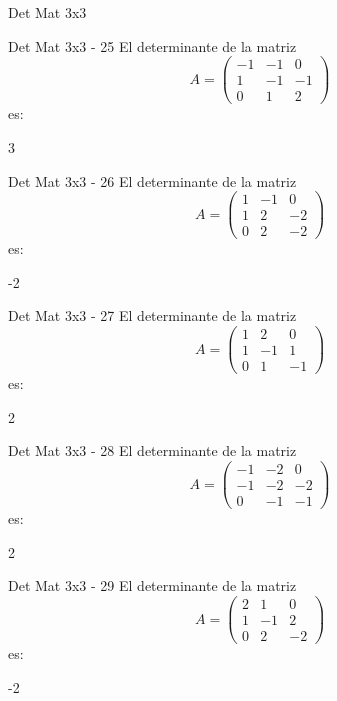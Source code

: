 \documentclass[a4,11pt]{aleph-notas}
\begin{document}
\begin{quiz}{Det Mat 3x3}
\begin{numerical}[tolerance=0]%
    {Det Mat 3x3 - 25}
    El determinante de la matriz
    \[
        A = \begin{pmatrix} -1 & -1 & 0 \\ 1 & -1 & -1 \\ 0 & 1 & 2 \end{pmatrix}
    \]
    es:
    \item[] 3
\end{numerical}

\begin{numerical}[tolerance=0]%
    {Det Mat 3x3 - 26}
    El determinante de la matriz
    \[
        A = \begin{pmatrix} 1 & -1 & 0 \\ 1 & 2 & -2 \\ 0 & 2 & -2 \end{pmatrix}
    \]
    es:
    \item[] -2
\end{numerical}

\begin{numerical}[tolerance=0]%
    {Det Mat 3x3 - 27}
    El determinante de la matriz
    \[
        A = \begin{pmatrix} 1 & 2 & 0 \\ 1 & -1 & 1 \\ 0 & 1 & -1 \end{pmatrix}
    \]
    es:
    \item[] 2
\end{numerical}

\begin{numerical}[tolerance=0]%
    {Det Mat 3x3 - 28}
    El determinante de la matriz
    \[
        A = \begin{pmatrix} -1 & -2 & 0 \\ -1 & -2 & -2 \\ 0 & -1 & -1 \end{pmatrix}
    \]
    es:
    \item[] 2
\end{numerical}

\begin{numerical}[tolerance=0]%
    {Det Mat 3x3 - 29}
    El determinante de la matriz
    \[
        A = \begin{pmatrix} 2 & 1 & 0 \\ 1 & -1 & 2 \\ 0 & 2 & -2 \end{pmatrix}
    \]
    es:
    \item[] -2
\end{numerical}


\end{quiz}
\end{document}
